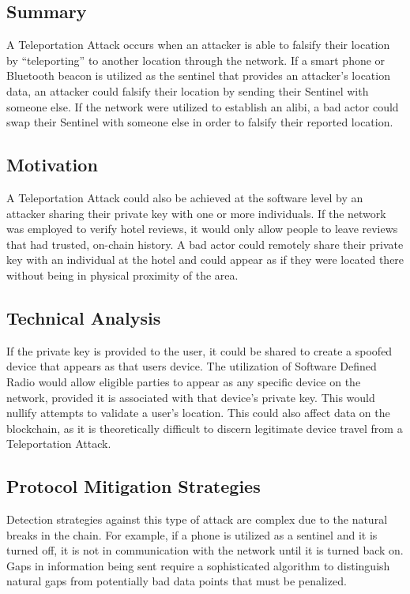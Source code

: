 \documentclass{article}
\begin{document}
\subsection{Summary}
A Teleportation Attack occurs when an attacker is able to falsify their location by ``teleporting'' to another location through the network. If a smart phone or Bluetooth beacon is utilized as the \Gls{sentinel} that provides an attacker's location data, an attacker could falsify their location by sending their Sentinel with someone else. If the network were utilized to establish an alibi, a bad actor could swap their Sentinel with someone else in order to falsify their reported location. 

\subsection{Motivation}
A Teleportation Attack could also be achieved at the software level by an attacker sharing their private key with one or more individuals. If the network was employed to verify hotel reviews, it would only allow people to leave reviews that had trusted, on-chain history. A bad actor could remotely share their private key with an individual at the hotel and could appear as if they were located there without being in physical proximity of the area.

\subsection{Technical Analysis}
If the private key is provided to the user, it could be shared to create a spoofed device that appears as that users device. The utilization of Software Defined Radio would allow eligible parties to appear as any specific device on the network, provided it is associated with that device's private key. This would nullify attempts to validate a user's location. This could also affect data on the blockchain, as it is theoretically difficult to discern legitimate device travel from a Teleportation Attack. 

\subsection{Protocol Mitigation Strategies}
Detection strategies against this type of attack are complex due to the natural breaks in the chain. For example, if a phone is utilized as a \Gls{sentinel} and it is turned off, it is not in communication with the network until it is turned back on. Gaps in information being sent require a sophisticated algorithm to distinguish natural gaps from potentially bad data points that must be penalized. 
\end{document}
